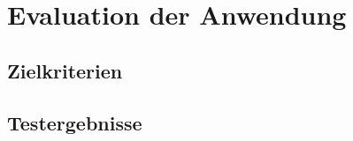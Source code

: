 \chapter{Evaluation der Anwendung}\label{chapter_6}
\section{Zielkriterien}
\section{Testergebnisse}